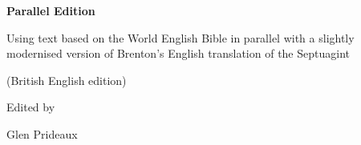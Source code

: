 \begin{titlepage}
\thispagestyle{empty}

\vspace*{\fill}

\begin{center}

{\Huge\bfseries \propertitle Parallel Edition\par}

\vspace{1.5em}

{\Large
Using text based on the World English Bible in parallel with a
slightly modernised version of Brenton's English translation of the
Septuagint\par}
\ifbritish (British English edition)\par\fi
\vspace{3em}

{\large Edited by\par}

\vspace{0.5em}

{\Large Glen Prideaux\par}

\end{center}

\vspace*{\fill}

\end{titlepage}